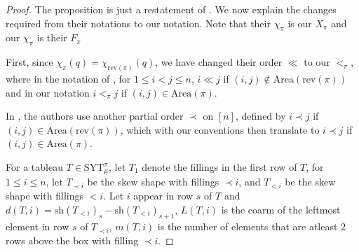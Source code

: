 \documentclass[12pt,reqno]{amsart}
\theoremstyle{plain}
\theoremstyle{definition}
\theoremstyle{remark}
\theoremstyle{example}
\numberwithin{equation}{section}
\newcommand{\rev}{\mathrm{rev}}
\newcommand{\SYT}{\mathrm{SYT}}
\newcommand{\Area}{\mathrm{Area}}
\begin{document}
\begin{proof}
	The proposition is just a restatement of \cite[Theorem 4.1]{GMRWW_Macexpansion}. We now explain the changes required from their notations to our notation. Note that their $\chi_\pi$ is our $X_\pi$ and our $\chi_\pi$ is their $F_\pi$
	
	First, since $\chi_\pi(q) = \chi_{\rev(\pi)}(q)$, we have changed their order $\ll$ to our $<_\pi$, where in the notation of \cite{GMRWW_Macexpansion}, for $1 \leq i < j \leq n$, $i \ll j$ if $(i,j) \notin \Area(\rev(\pi))$ and in our notation $i<_\pi j$ if $(i,j) \in \Area(\pi)$.    
	
	In \cite{GMRWW_Macexpansion}, the authors use another partial order $\prec$ on $[n]$, defined by $i \prec j$ if $(i,j) \in \Area(\rev(\pi))$, which with our conventions then translate to $i \prec j$ if $(i,j) \in \Area(\pi)$.
	
	For a tableau $T \in \SYT^\pi_\mu$, let $T_1$ denote the fillings in the first row of $T$, for $1 \leq i \leq n$, let $T_{\prec i}$ be the skew shape with fillings $\prec i$, and $T_{<i}$ be the skew shape with fillings $<i$. Let $i$ appear in row $s$ of $T$ and $d(T,i) = \mathrm{sh}(T_{<i})_s - \mathrm{sh}(T_{<i})_{s+1}$, $L(T,i)$ is the coarm of the leftmost element in row $s$ of $T_{\prec i}$, $m(T,i)$ is the number of elements that are atleast $2$ rows above the box with filling $\prec i$.  
	

\end{proof}
\end{document}
